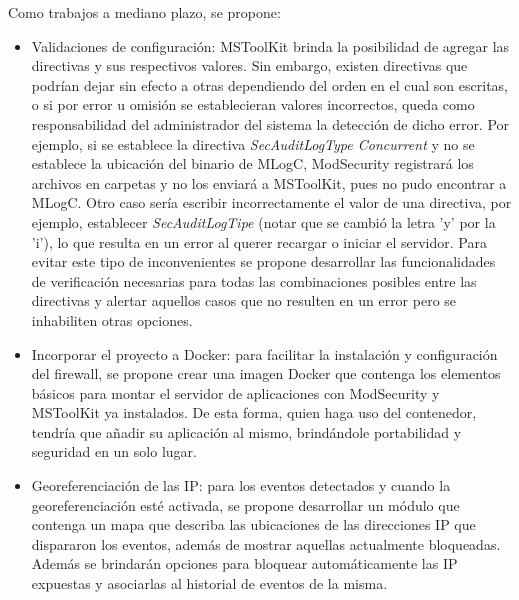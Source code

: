 Como trabajos a mediano plazo, se propone:
\begin{itemize}
	\item Validaciones de configuración: MSToolKit brinda la posibilidad de agregar las directivas y sus respectivos valores. Sin embargo, existen directivas que podrían dejar sin efecto a otras dependiendo del orden en el cual son escritas, o si por error u omisión se establecieran valores incorrectos, queda como responsabilidad del administrador del sistema la detección de dicho error. Por ejemplo, si se establece la directiva \textit{SecAuditLogType Concurrent} y no se establece la ubicación del binario de MLogC, ModSecurity registrará los archivos en carpetas y no los enviará a MSToolKit, pues no pudo encontrar a MLogC. Otro caso sería escribir incorrectamente el valor de una directiva, por ejemplo, establecer \textit{SecAuditLogTipe} (notar que se cambió la letra 'y' por la 'i'), lo que resulta en un error al querer recargar o iniciar el servidor. Para evitar este tipo de inconvenientes se propone desarrollar las funcionalidades de verificación necesarias para todas las combinaciones posibles entre las directivas y alertar aquellos casos que no resulten en un error pero se inhabiliten otras opciones.
	\item Incorporar el proyecto a Docker: para facilitar la instalación y configuración del firewall, se propone crear una imagen Docker que contenga los elementos básicos para montar el servidor de aplicaciones con ModSecurity y MSToolKit ya instalados. De esta forma, quien haga uso del contenedor, tendría que añadir su aplicación al mismo, brindándole portabilidad y seguridad en un solo lugar.
	\item Georeferenciación de las IP: para los eventos detectados y cuando la georeferenciación esté activada, se propone desarrollar un módulo que contenga un mapa que describa las ubicaciones de las direcciones IP que dispararon los eventos, además de mostrar aquellas actualmente bloqueadas. Además se brindarán opciones para bloquear automáticamente las IP expuestas y asociarlas al historial de eventos de la misma.
\end{itemize}